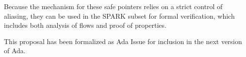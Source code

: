 \documentclass{llncs}
\begin{document}
Because the mechanism for these safe pointers relies on a strict control of aliasing, they can be used in the SPARK subset for formal verification, which
includes both analysis of flows and proof of properties.

This proposal has been formalized as Ada Issue \cite{AI2018} for inclusion in the next version of Ada.

\nolinenumbers
\printbibliography[title={References}]
\end{document}
